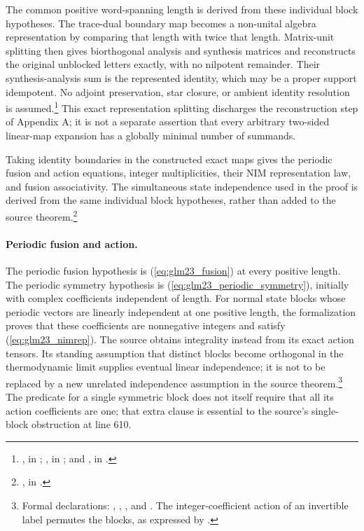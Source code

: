 \documentclass{article}
\begin{document}
The common positive word-spanning length is derived from these individual
block hypotheses. The trace-dual boundary map becomes a non-unital algebra
representation by comparing that length with twice that length.
Matrix-unit splitting then gives biorthogonal analysis and synthesis
matrices and reconstructs the original unblocked letters exactly, with no
nilpotent remainder. Their synthesis-analysis sum is the represented
identity, which may be a proper support idempotent. No adjoint preservation,
star closure, or ambient identity resolution is assumed.\footnote{
    , in
    ;
    , in
    ; and
    , in
    .}
This exact representation splitting discharges the reconstruction step of
Appendix A; it is not a separate assertion that every arbitrary two-sided
linear-map expansion has a globally minimal number of summands.

Taking identity boundaries in the constructed exact maps gives the
periodic fusion and action equations, integer multiplicities, their NIM
representation law, and fusion associativity. The simultaneous state
independence used in the proof is derived from the same individual block
hypotheses, rather than added to the source theorem.\footnote{
    , in
    .}

\paragraph{Periodic fusion and action.}
The periodic fusion hypothesis is (\ref{eq:glm23_fusion}) at every positive
length. The periodic symmetry hypothesis is
(\ref{eq:glm23_periodic_symmetry}), initially with complex coefficients
independent of length. For normal state blocks whose periodic vectors are
linearly independent at one positive length, the formalization proves that
these coefficients are nonnegative integers and satisfy
(\ref{eq:glm23_nimrep}). The source obtains integrality instead from its
exact action tensors. Its standing assumption that distinct blocks become
orthogonal in the thermodynamic limit supplies eventual linear
independence; it is not to be replaced by a new unrelated independence
assumption in the source theorem.\footnote{Formal declarations:
    ,
    ,
    , and
    .
    The integer-coefficient action of an invertible label permutes the blocks,
    as expressed by
    .}
The predicate for a single symmetric block does not itself require that
all its action coefficients are one; that extra clause is essential to
the source's single-block obstruction at line 610.
\end{document}
